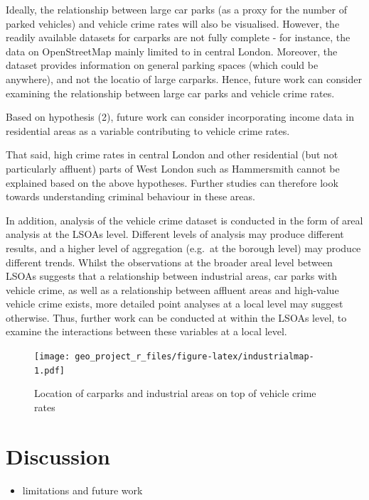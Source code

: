 \documentclass[]{article}
\providecommand{\tightlist}{%
  \setlength{\itemsep}{0pt}\setlength{\parskip}{0pt}}
\theoremstyle{definition}
\theoremstyle{definition}
\theoremstyle{definition}
\theoremstyle{remark}
\begin{document}
Ideally, the relationship between large car parks (as a proxy for the
number of parked vehicles) and vehicle crime rates will also be
visualised. However, the readily available datasets for carparks are not
fully complete - for instance, the data on OpenStreetMap mainly limited
to in central London. Moreover, the dataset provides information on
general parking spaces (which could be anywhere), and not the locatio of
large carparks. Hence, future work can consider examining the
relationship between large car parks and vehicle crime rates.

Based on hypothesis (2), future work can consider incorporating income
data in residential areas as a variable contributing to vehicle crime
rates.

That said, high crime rates in central London and other residential (but
not particularly affluent) parts of West London such as Hammersmith
cannot be explained based on the above hypotheses. Further studies can
therefore look towards understanding criminal behaviour in these areas.

In addition, analysis of the vehicle crime dataset is conducted in the
form of areal analysis at the LSOAs level. Different levels of analysis
may produce different results, and a higher level of aggregation
(e.g.~at the borough level) may produce different trends. Whilst the
observations at the broader areal level between LSOAs suggests that a
relationship between industrial areas, car parks with vehicle crime, as
well as a relationship between affluent areas and high-value vehicle
crime exists, more detailed point analyses at a local level may suggest
otherwise. Thus, further work can be conducted at within the LSOAs
level, to examine the interactions between these variables at a local
level.

\begin{figure}
\centering
\texttt{[image: geo\_project\_r\_files/figure-latex/industrialmap-1.pdf]}
\caption{\label{fig:industrialmap}Location of carparks and industrial areas
on top of vehicle crime rates}
\end{figure}

\pagebreak

\section{Discussion}\label{discussion-1}

\begin{itemize}
\tightlist
\item
  limitations and future work
\end{itemize}
\end{document}
